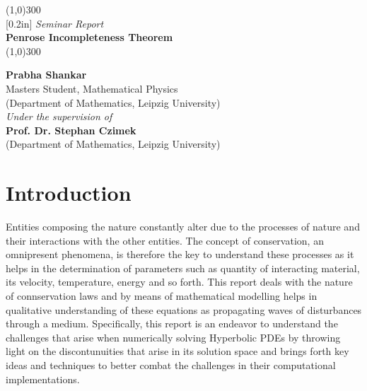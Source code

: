\documentclass[11pt, a4paper]{report}
\theoremstyle{bfnote}
\begin{document}
\begin{titlepage}
    \begin{center}
    \line(1,0){300}\\
    [0.2in]
    \normalsize{\emph {Seminar Report}}\\	
    \Huge{\bfseries Penrose Incompleteness Theorem}\\
    [-0.12in]
    \line(1,0){300}\\
    
    \vspace{3in}
    
    \LARGE{\bfseries {Prabha Shankar}}\\
    \small{Masters Student, Mathematical Physics}\\
    \small{(Department of Mathematics, Leipzig University)}\\
    
    \vspace{3cm}
    \normalsize{\emph {Under the supervision of}}\\
    \large{\bfseries {Prof. Dr. Stephan Czimek}}\\
    \small{(Department of Mathematics, Leipzig University)}\\
    
    \end{center}
\end{titlepage}

\chapter{Introduction}
Entities composing the nature constantly alter due to the processes of nature
and their interactions with the other entities. The concept of conservation, an
omnipresent phenomena, is therefore the key to understand these processes as it
helps in the determination of parameters such as quantity of interacting
material, its velocity, temperature, energy and so forth. This report deals with
the nature of connservation laws and by means of mathematical modelling helps in
qualitative understanding of these equations as propagating waves of
disturbances through a medium. Specifically, this report is an endeavor to
understand the challenges that arise when numerically solving Hyperbolic PDEs by
throwing light on the discontunuities that arise in its solution space and
brings forth key ideas and techniques to better combat the challenges in their
computational implementations. 
\end{document}

